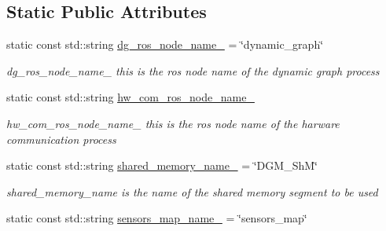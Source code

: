 \subsection*{Static Public Attributes}
\begin{DoxyCompactItemize}
\item 
static const std\+::string \hyperlink{classdynamic__graph_1_1DynamicGraphManager_a391d7a3f7c3df820d31f2c1d0ff7fc51}{dg\+\_\+ros\+\_\+node\+\_\+name\+\_\+} = \char`\"{}dynamic\+\_\+graph\char`\"{}\hypertarget{classdynamic__graph_1_1DynamicGraphManager_a391d7a3f7c3df820d31f2c1d0ff7fc51}{}\label{classdynamic__graph_1_1DynamicGraphManager_a391d7a3f7c3df820d31f2c1d0ff7fc51}

\begin{DoxyCompactList}\small\item\em dg\+\_\+ros\+\_\+node\+\_\+name\+\_\+ this is the ros node name of the dynamic graph process \end{DoxyCompactList}\item 
static const std\+::string \hyperlink{classdynamic__graph_1_1DynamicGraphManager_a415f24927dbe9dfd0ee4a6462428bd48}{hw\+\_\+com\+\_\+ros\+\_\+node\+\_\+name\+\_\+}
\begin{DoxyCompactList}\small\item\em hw\+\_\+com\+\_\+ros\+\_\+node\+\_\+name\+\_\+ this is the ros node name of the harware communication process \end{DoxyCompactList}\item 
static const std\+::string \hyperlink{classdynamic__graph_1_1DynamicGraphManager_a97fa7b0a31efa6192c3dcc44fbe63886}{shared\+\_\+memory\+\_\+name\+\_\+} = \char`\"{}D\+G\+M\+\_\+\+ShM\char`\"{}\hypertarget{classdynamic__graph_1_1DynamicGraphManager_a97fa7b0a31efa6192c3dcc44fbe63886}{}\label{classdynamic__graph_1_1DynamicGraphManager_a97fa7b0a31efa6192c3dcc44fbe63886}

\begin{DoxyCompactList}\small\item\em shared\+\_\+memory\+\_\+name is the name of the shared memory segment to be used \end{DoxyCompactList}\item 
static const std\+::string \hyperlink{classdynamic__graph_1_1DynamicGraphManager_abd4e4f618fbdacfda8c2cdece08e401b}{sensors\+\_\+map\+\_\+name\+\_\+} = \char`\"{}sensors\+\_\+map\char`\"{}\hypertarget{classdynamic__graph_1_1DynamicGraphManager_abd4e4f618fbdacfda8c2cdece08e401b}{}\label{classdynamic__graph_1_1DynamicGraphManager_abd4e4f618fbdacfda8c2cdece08e401b}


\end{DoxyCompactItemize}
